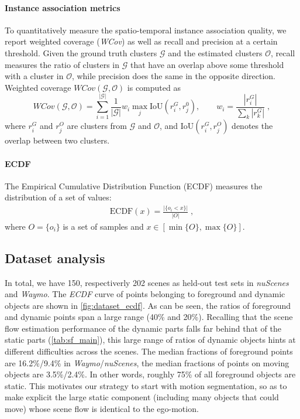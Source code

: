 \paragraph{Instance association metrics}
To quantitatively measure the spatio-temporal instance association quality, we report weighted coverage (\textit{WCov}) as well as recall and precision at a certain threshold. Given the ground truth clusters $\mathcal{G}$ and the estimated clusters $\mathcal{O}$, recall measures the ratio of clusters in $\mathcal{G}$ that have an overlap above some threshold with a cluster in $\mathcal{O}$, while precision does the same in the opposite direction. Weighted coverage $WCov (\mathcal{G},\mathcal{O})$ is computed as
\begin{equation}
    WCov(\mathcal{G}, \mathcal{O}) = \sum_{i=1}^{|\mathcal{G}|} \frac{1}{|\mathcal{G}|} w_i \max_j \mathrm{IoU} (r_i^G, r_j^0), \qquad  w_i = \frac{|r_i^G|}{\sum_k |r_k^G|}\;,
\end{equation}
where $r_i^G$ and $r_j^O$ are clusters from $\mathcal{G}$ and $\mathcal{O}$, and $\mathrm{IoU}(r_i^G, r_j^O)$ denotes the overlap between two clusters. 

\paragraph{ECDF}
The Empirical Cumulative Distribution Function (ECDF) measures the distribution of a set of values:
\begin{equation}
\begin{aligned}
\text{ECDF} (x) = \frac{\big|\{o_i < x\}\big|}{\big|O\big|}\;,
\end{aligned}
\end{equation}
where $O = \{o_i\}$ is a set of samples and $x \in [\min\{O\}, \max\{O\}]$.

\subsection{Dataset analysis}
\label{sec:supp_dataset}


In total, we have 150, respectiverly 202 scenes as held-out test sets in \emph{nuScenes} and \emph{Waymo}. The \textit{ECDF} curve of points belonging to foreground and dynamic objects are shown in \cref{fig:dataset_ecdf}. As can be seen, the ratios of foreground and dynamic points span a large range (40\% and 20\%). Recalling that the scene flow estimation performance of the dynamic parts falls far behind that of the static parts (\cref{tab:sf_main}), this large range of ratios of dynamic objects hints at different difficulties across the scenes. The median fractions of foreground points are 16.2\%/9.4\% in \emph{Waymo}/\emph{nuScenes}, the median fractions of points on moving objects are 3.5\%/2.4\%. In other words, roughly 75\% of all foreground objects are static. This motivates
our strategy to start with motion segmentation, so as to make explicit the large static component (including many objects that could move) whose scene flow is identical to the ego-motion.

